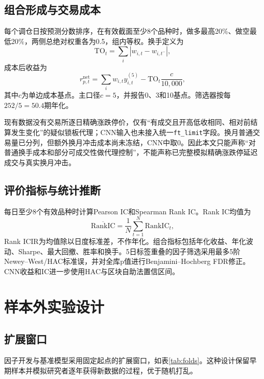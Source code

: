 \documentclass[UTF8,zihao=-4,fontset=ubuntu]{ctexart}
\newcommand{\rankic}{\mathrm{RankIC}}
\newcommand{\code}[1]{\texttt{#1}}
\begin{document}
\subsection{组合形成与交易成本}

每个调仓日按预测分数排序，在有效截面至少8个品种时，做多最高20\%、做空最低20\%，两侧总绝对权重各为0.5，组内等权。换手定义为
\begin{equation}
\mathrm{TO}_t=\sum_i\left|w_{i,t}-w_{i,t^-}\right|,
\end{equation}
成本后收益为
\begin{equation}
r_{p,t}^{\mathrm{net}}=\sum_i w_{i,t}y_{i,t}^{(5)}-\mathrm{TO}_t\frac{c}{10,000},
\end{equation}
其中\(c\)为单边成本基点。主口径\(c=5\)，并报告0、3和10基点。筛选器按每\(252/5=50.4\)期年化。

现有数据没有交易所逐日精确涨跌停价，仅有“有成交且开高低收相同、相对前结算发生变化”的疑似锁板代理；CNN输入也未接入统一\code{ft\_limit}字段。换月普通交易量已分列，但额外换月冲击成本尚未冻结，CNN中取0。因此本文只能声称“对普通换手成本和部分可成交性做代理控制”，不能声称已完整模拟精确涨跌停延迟成交与真实换月冲击。

\subsection{评价指标与统计推断}

每日至少8个有效品种时计算Pearson IC和Spearman Rank IC。Rank IC均值为
\begin{equation}
\overline{\rankic}=\frac{1}{N}\sum_{t=1}^N\rankic_t,
\end{equation}
Rank ICIR为均值除以日度标准差，不作年化。组合指标包括年化收益、年化波动、Sharpe、最大回撤、胜率和换手。5日标签重叠的因子筛选采用最多5阶Newey--West/HAC标准误，并对全库p值进行Benjamini--Hochberg FDR修正。CNN收益和IC进一步使用HAC与区块自助法置信区间。

\section{样本外实验设计}

\subsection{扩展窗口}

因子开发与基准模型采用固定起点的扩展窗口，如表\ref{tab:folds}。这种设计保留早期样本并模拟研究者逐年获得新数据的过程，优于随机打乱。
\end{document}
